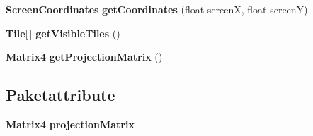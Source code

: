 \begin{DoxyCompactItemize}
\item 
{\bf \-Screen\-Coordinates} {\bfseries get\-Coordinates} (float screen\-X, float screen\-Y)\label{classde_1_1joglearth_1_1geometry_1_1_camera_a685be4a671f6e7fe6bdec17c1a09f3f1}

\item 
{\bf \-Tile}[$\,$] {\bfseries get\-Visible\-Tiles} ()\label{classde_1_1joglearth_1_1geometry_1_1_camera_aa4704ce2be569a3551d3f43cf5a44646}

\item 
{\bf \-Matrix4} {\bfseries get\-Projection\-Matrix} ()\label{classde_1_1joglearth_1_1geometry_1_1_camera_acddc48206fc1c2374010be00f23e0ef7}

\end{DoxyCompactItemize}
\subsection*{\-Paketattribute}
\begin{DoxyCompactItemize}
\item 
{\bf \-Matrix4} {\bfseries projection\-Matrix}\label{classde_1_1joglearth_1_1geometry_1_1_camera_a42e23b6255ead80333552de46b300633}

\end{DoxyCompactItemize}

